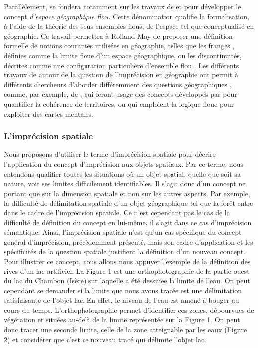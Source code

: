 Parallèlement, \textcite{Rolland-May1984,Rolland-May1987} se fondera
notamment sur les travaux de \textcite{Gale1972,Gale1976} et
\textcite{Leung1979} pour développer le concept\emph{ d’espace
  géographique flou.} Cette dénomination qualifie la formalisation, à
l’aide de la théorie des sous-ensembles flous, de l’espace tel que
conceptualisé en géographie. Ce travail permettra à Rolland-May de
proposer une définition formelle de notions courantes utilisées en
géographie, telles que les franges \autocite{Rolland-May1987},
définies comme la limite floue d’un espace géographique, ou les
discontinuités, décrites comme une configuration particulière
d’ensemble flou \autocite{Rolland-May2003}. Les différents travaux de
 autour de la question de l’imprécision en géographie
ont permit à différents chercheurs d’aborder différemment des
questions géographiques \textcite{Dutozia2014}, comme, par exemple, de
\textcite{Ruffray2004}, qui feront usage des concepts développés par
 pour quantifier la cohérence de territoires, ou
\textcite{Didelon2011} qui emploient la logique floue pour exploiter
des cartes mentales.

\subsubsection{L’imprécision spatiale}

Nous proposons d’utiliser le terme d’imprécision spatiale pour décrire
l’application du concept d’imprécision aux objets spatiaux. Par ce
terme, nous entendons qualifier toutes les situations où un objet
spatial, quelle que soit sa nature, voit ses limites difficilement
identifiables. Il s’agit donc d’un concept ne portant que sur la
dimension spatiale et non sur les autres aspects. Par exemple, la
difficulté de délimitation spatiale d’un objet géographique tel que la
forêt entre dans le cadre de l’imprécision spatiale. Ce n’est
cependant pas le cas de la difficulté de définition du concept en
lui-même, il s’agit dans ce cas d’imprécision sémantique. Ainsi,
l’imprécision spatiale n’est qu’un cas spécifique du concept général
d’imprécision, précédemment présenté, mais son cadre d’application et
les spécificités de la question spatiale justifient la définition d’un
nouveau concept.  Pour illustrer ce concept, nous allons nous appuyer
l’exemple de la définition des rives d’un lac artificiel. La Figure 1
est une orthophotographie de la partie ouest du lac du Chambon (Isère)
sur laquelle a été dessinée la limite de l’eau. On peut cependant se
demander si la limite que nous avons tracée est une délimitation
satisfaisante de l’objet lac. En effet, le niveau de l’eau est amené à
bouger au cours du temps. L’orthophotographie permet d’identifier ces
zones, dépourvues de végétation et situées au-delà de la limite
représentée sur la Figure 1. On peut donc tracer une seconde limite,
celle de la zone atteignable par les eaux (Figure 2) et considérer que
c’est ce nouveau tracé qui délimite l’objet lac.

